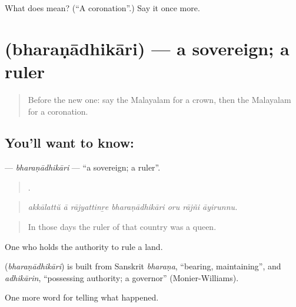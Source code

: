 \begin{tcolorbox}[breakable,colback=teal!4,colframe=teal!35!black,title={Before you move on}]
What does  mean? (\textquotedblleft{}A coronation\textquotedblright{}.) Say it once more.
\end{tcolorbox}
\section[\texorpdfstring{\ml{ഭരണാധികാരി} (bharaṇādhikāri)}{ഭരണാധികാരി (bharaṇādhikāri)}]{ (bharaṇādhikāri) — a sovereign; a ruler}

\label{lesson:ML-C398-bharanadhikari}



\begin{quote}
Before the new one: say the Malayalam for a crown, then the Malayalam for a coronation.
\end{quote}

\subsection*{You'll want to know: }
\textbf{} — \emph{bharaṇādhikāri} — \textquotedblleft{}a sovereign; a ruler\textquotedblright{}.

\begin{quote}
      .
\end{quote}

\begin{quote}
\emph{akkālattŭ ā rājyattinṟe bharaṇādhikāri oru rājñi āyirunnu.}
\end{quote}

\begin{quote}
In those days the ruler of that country was a queen.
\end{quote}

One who holds the authority to rule a land.

\begin{cousinweb}
\textbf{} (\emph{bharaṇādhikāri}) is built from Sanskrit \emph{bharaṇa}, \textquotedblleft{}bearing, maintaining\textquotedblright{}, and \emph{adhikārin}, \textquotedblleft{}possessing authority; a governor\textquotedblright{} (Monier-Williams).
\end{cousinweb}

\begin{grammarlens}[title={What you've built}]
One more word for telling what happened.
\end{grammarlens}

